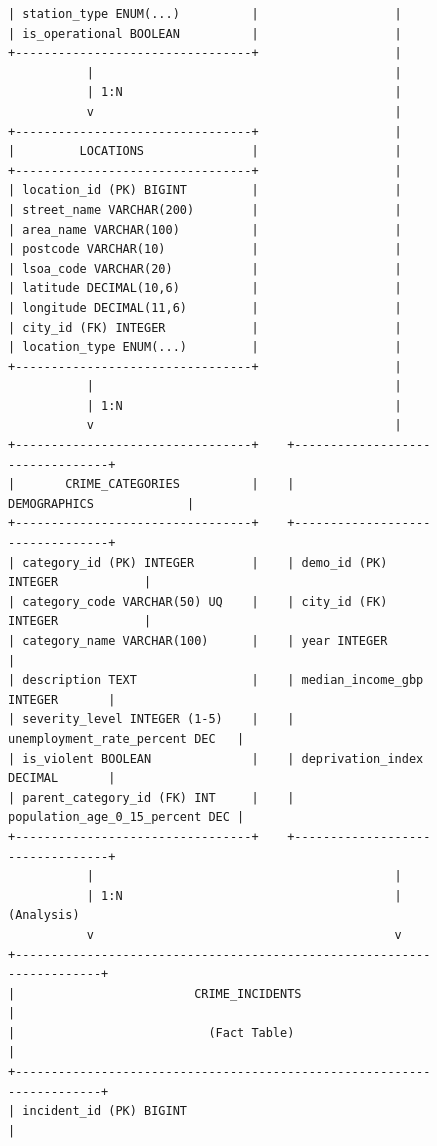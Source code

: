 \documentclass[12pt,a4paper]{article}
\begin{document}
\begin{figure}[h]
\begin{verbatim}
| station_type ENUM(...)          |                   |
| is_operational BOOLEAN          |                   |
+---------------------------------+                   |
           |                                          |
           | 1:N                                      |
           v                                          |
+---------------------------------+                   |
|         LOCATIONS               |                   |
+---------------------------------+                   |
| location_id (PK) BIGINT         |                   |
| street_name VARCHAR(200)        |                   |
| area_name VARCHAR(100)          |                   |
| postcode VARCHAR(10)            |                   |
| lsoa_code VARCHAR(20)           |                   |
| latitude DECIMAL(10,6)          |                   |
| longitude DECIMAL(11,6)         |                   |
| city_id (FK) INTEGER            |                   |
| location_type ENUM(...)         |                   |
+---------------------------------+                   |
           |                                          |
           | 1:N                                      |
           v                                          |
+---------------------------------+    +---------------------------------+
|       CRIME_CATEGORIES          |    |        DEMOGRAPHICS             |
+---------------------------------+    +---------------------------------+
| category_id (PK) INTEGER        |    | demo_id (PK) INTEGER            |
| category_code VARCHAR(50) UQ    |    | city_id (FK) INTEGER            |
| category_name VARCHAR(100)      |    | year INTEGER                    |
| description TEXT                |    | median_income_gbp INTEGER       |
| severity_level INTEGER (1-5)    |    | unemployment_rate_percent DEC   |
| is_violent BOOLEAN              |    | deprivation_index DECIMAL       |
| parent_category_id (FK) INT     |    | population_age_0_15_percent DEC |
+---------------------------------+    +---------------------------------+
           |                                          |
           | 1:N                                      | (Analysis)
           v                                          v
+-----------------------------------------------------------------------+
|                         CRIME_INCIDENTS                               |
|                           (Fact Table)                               |
+-----------------------------------------------------------------------+
| incident_id (PK) BIGINT                                               |

\end{verbatim}
\end{figure}
\end{document}

